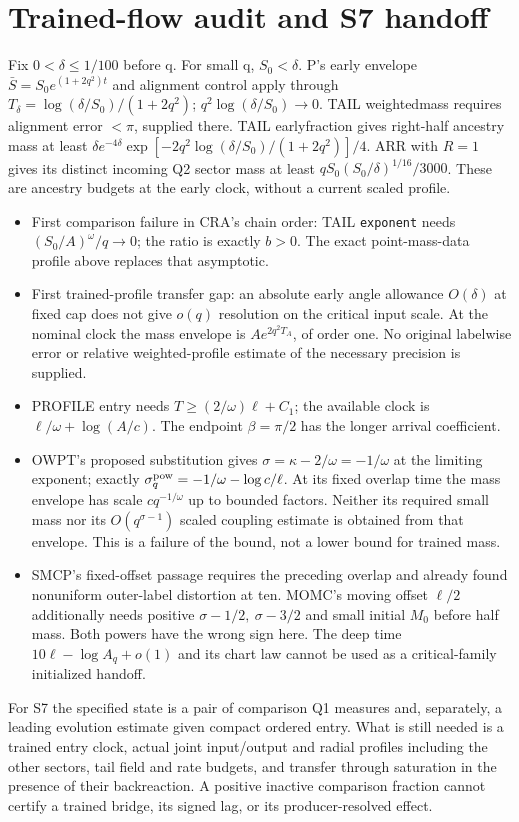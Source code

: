 \documentclass[11pt]{article}
\begin{document}
\section{Trained-flow audit and S7 handoff}\label{an04cfsv1:original}
Fix \(0<\delta\le1/100\) before q. For small q, \(S_0<\delta\).
P's early envelope \(\bar S=S_0e^{(1+2q^2)t}\) and alignment
control apply through \(T_\delta=\log(\delta/S_0)/(1+2q^2)\);
\(q^2\log(\delta/S_0)\to0\). TAIL weightedmass requires alignment
error \(<\pi\), supplied there. TAIL earlyfraction gives
right-half ancestry mass at least
\(\delta e^{-4\delta}\exp[-2q^2\log(\delta/S_0)/(1+2q^2)]/4\).
ARR with \(R=1\) gives its distinct incoming Q2 sector mass
at least \(qS_0(S_0/\delta)^{1/16}/3000\). These are ancestry
budgets at the early clock, without a current scaled profile.
\begin{itemize}
\item First comparison failure in CRA's chain order: TAIL
\texttt{exponent} needs \((S_0/A)^\omega/q\to0\); the ratio
is exactly \(b>0\). The exact point-mass-data profile above replaces
that asymptotic.
\item First trained-profile transfer gap: an absolute early angle
allowance \(O(\delta)\) at fixed cap does not give \(o(q)\)
resolution on the critical input scale. At the nominal clock the
mass envelope is \(Ae^{2q^2T_A}\), of order one. No original labelwise
error or relative weighted-profile estimate of the necessary precision
is supplied.
\item PROFILE entry needs \(T\ge (2/\omega)\ell+C_1\);
the available clock is \(\ell/\omega+\log(A/c)\).
The endpoint \(\beta=\pi/2\) has the longer arrival coefficient.
\item OWPT's proposed substitution gives
\(\sigma=\kappa-2/\omega=-1/\omega\) at the limiting exponent;
exactly \(\sigma_q^{\rm pow}=-1/\omega-\log c/\ell\).
At its fixed overlap time the mass envelope has scale
\(c q^{-1/\omega}\) up to bounded factors. Neither its required
small mass nor its \(O(q^{\sigma-1})\) scaled coupling estimate is
obtained from that envelope. This is a failure of the bound, not a
lower bound for trained mass.
\item SMCP's fixed-offset passage requires the preceding overlap
and already found nonuniform outer-label distortion at ten.
MOMC's moving offset \(\ell/2\) additionally needs positive
\(\sigma-1/2,\ \sigma-3/2\) and small initial \(M_0\) before
half mass. Both powers have the wrong sign here. The deep time
\(10\ell-\log A_q+o(1)\) and its chart law cannot be used as a
critical-family initialized handoff.
\end{itemize}
For S7 the specified state is a pair of comparison Q1 measures and,
separately, a leading evolution estimate given compact ordered entry.
What is still needed is a trained entry clock, actual joint input/output
and radial profiles including the other sectors, tail field and rate
budgets, and transfer through saturation in the presence of their
backreaction. A positive inactive comparison fraction cannot certify a
trained bridge, its signed lag, or its producer-resolved effect.
\end{document}

